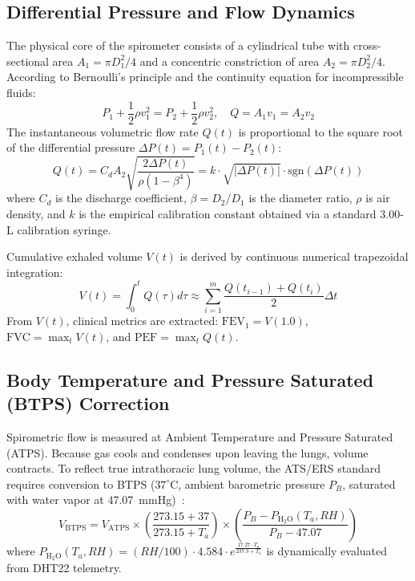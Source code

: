 \documentclass[conference]{IEEEtran}
\begin{document}
\subsection{Differential Pressure and Flow Dynamics}
The physical core of the spirometer consists of a cylindrical tube with cross-sectional area $A_1 = \pi D_1^2 / 4$ and a concentric constriction of area $A_2 = \pi D_2^2 / 4$. According to Bernoulli's principle and the continuity equation for incompressible fluids:
\begin{equation}
P_1 + \frac{1}{2}\rho v_1^2 = P_2 + \frac{1}{2}\rho v_2^2, \quad Q = A_1 v_1 = A_2 v_2
\end{equation}
The instantaneous volumetric flow rate $Q(t)$ is proportional to the square root of the differential pressure $\Delta P(t) = P_1(t) - P_2(t)$:
\begin{equation}
Q(t) = C_d A_2 \sqrt{\frac{2\Delta P(t)}{\rho \left(1 - \beta^4\right)}} = k \cdot \sqrt{|\Delta P(t)|} \cdot \text{sgn}(\Delta P(t))
\end{equation}
where $C_d$ is the discharge coefficient, $\beta = D_2 / D_1$ is the diameter ratio, $\rho$ is air density, and $k$ is the empirical calibration constant obtained via a standard 3.00-L calibration syringe.

Cumulative exhaled volume $V(t)$ is derived by continuous numerical trapezoidal integration:
\begin{equation}
V(t) = \int_0^t Q(\tau) d\tau \approx \sum_{i=1}^m \frac{Q(t_{i-1}) + Q(t_i)}{2} \Delta t
\end{equation}
From $V(t)$, clinical metrics are extracted: $\text{FEV}_1 = V(1.0)$, $\text{FVC} = \max_{t} V(t)$, and $\text{PEF} = \max_{t} Q(t)$.

\subsection{Body Temperature and Pressure Saturated (BTPS) Correction}
Spirometric flow is measured at Ambient Temperature and Pressure Saturated (ATPS). Because gas cools and condenses upon leaving the lungs, volume contracts. To reflect true intrathoracic lung volume, the ATS/ERS standard requires conversion to BTPS ($37^\circ\text{C}$, ambient barometric pressure $P_B$, saturated with water vapor at 47.07~mmHg)~\cite{graham2019spirometry}:
\begin{equation}
V_{\text{BTPS}} = V_{\text{ATPS}} \times \left( \frac{273.15 + 37}{273.15 + T_a} \right) \times \left( \frac{P_B - P_{\text{H}_2\text{O}}(T_a, RH)}{P_B - 47.07} \right)
\end{equation}
where $P_{\text{H}_2\text{O}}(T_a, RH) = (RH/100) \cdot 4.584 \cdot e^{\frac{17.27 \cdot T_a}{237.3 + T_a}}$ is dynamically evaluated from DHT22 telemetry.
\end{document}

